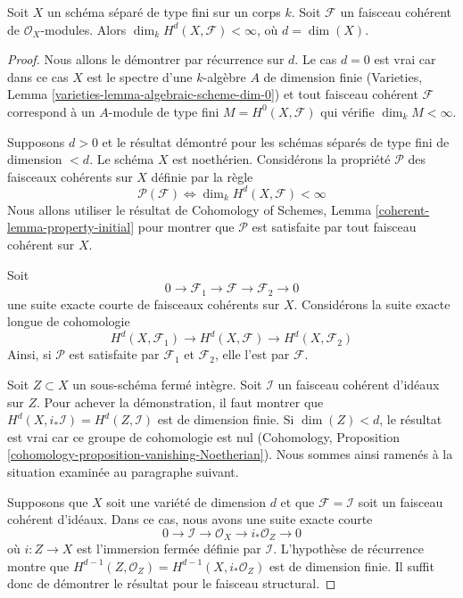 \begin{lemma}
\label{lemma-top-cohomology-coherent}
Soit $X$ un sch\'ema s\'epar\'e de type fini sur un corps $k$.
Soit $\mathcal{F}$ un faisceau coh\'erent de $\mathcal{O}_X$-modules.
Alors $\dim_k H^d(X, \mathcal{F}) < \infty$, o\`u $d = \dim(X)$.
\end{lemma}

\begin{proof}
Nous allons le d\'emontrer par r\'ecurrence sur $d$. Le cas $d = 0$ est vrai car
dans ce cas $X$ est le spectre d'une $k$-alg\`ebre $A$ de dimension finie
(Varieties, Lemma \ref{varieties-lemma-algebraic-scheme-dim-0})
et tout faisceau coh\'erent $\mathcal{F}$ correspond \`a un $A$-module de type fini
$M = H^0(X, \mathcal{F})$ qui v\'erifie $\dim_k M < \infty$.

\medskip\noindent
Supposons $d > 0$ et le r\'esultat d\'emontr\'e pour les sch\'emas s\'epar\'es
de type fini de dimension $< d$. Le sch\'ema $X$ est noeth\'erien. Consid\'erons
la propri\'et\'e $\mathcal{P}$ des faisceaux coh\'erents sur $X$ d\'efinie par la r\`egle
$$
\mathcal{P}(\mathcal{F}) \Leftrightarrow
\dim_k H^d(X, \mathcal{F}) < \infty
$$
Nous allons utiliser le r\'esultat de
Cohomology of Schemes, Lemma \ref{coherent-lemma-property-initial}
pour montrer que $\mathcal{P}$ est satisfaite par tout faisceau coh\'erent sur $X$.

\medskip\noindent
Soit
$$
0 \to \mathcal{F}_1 \to \mathcal{F} \to \mathcal{F}_2 \to 0
$$
une suite exacte courte de faisceaux coh\'erents sur $X$.
Consid\'erons la suite exacte longue de cohomologie
$$
H^d(X, \mathcal{F}_1) \to
H^d(X, \mathcal{F}) \to
H^d(X, \mathcal{F}_2)
$$
Ainsi, si $\mathcal{P}$ est satisfaite par $\mathcal{F}_1$ et $\mathcal{F}_2$,
elle l'est par $\mathcal{F}$.

\medskip\noindent
Soit $Z \subset X$ un sous-sch\'ema ferm\'e int\`egre. Soit $\mathcal{I}$
un faisceau coh\'erent d'id\'eaux sur $Z$. Pour achever la d\'emonstration, il faut montrer
que $H^d(X, i_*\mathcal{I}) = H^d(Z, \mathcal{I})$ est de dimension finie.
Si $\dim(Z) < d$, le r\'esultat est vrai car ce groupe de cohomologie
est nul (Cohomology, Proposition
\ref{cohomology-proposition-vanishing-Noetherian}).
Nous sommes ainsi ramen\'es \`a la situation examin\'ee au paragraphe suivant.

\medskip\noindent
Supposons que $X$ soit une vari\'et\'e de dimension $d$ et que
$\mathcal{F} = \mathcal{I}$ soit un faisceau coh\'erent d'id\'eaux. Dans ce
cas, nous avons une suite exacte courte
$$
0 \to \mathcal{I} \to \mathcal{O}_X \to i_*\mathcal{O}_Z \to 0
$$
o\`u $i : Z \to X$ est l'immersion ferm\'ee d\'efinie par $\mathcal{I}$.
L'hypoth\`ese de r\'ecurrence montre que
$H^{d - 1}(Z, \mathcal{O}_Z) = H^{d - 1}(X, i_*\mathcal{O}_Z)$ est
de dimension finie. Il suffit donc de d\'emontrer le r\'esultat
pour le faisceau structural.


\end{proof}
